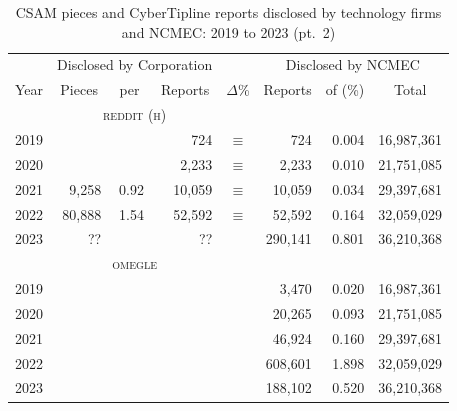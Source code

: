 \documentclass[nonacm,screen]{acmart}
\newcommand\same{\multicolumn{1}{c}{$\equiv$}}
\newcommand\missing{\multicolumn{1}{r}{??}}
\begin{document}
\begin{itemize}
\begin{table}
\begin{tabular}{r@{\hskip 1.5em}rrr r@{\hskip 1.5em}rrr}
\bottomrule
\end{tabular}
\end{table}

\begin{table}
\centering\libertineLF

\caption{CSAM pieces and CyberTipline reports disclosed by technology firms and NCMEC: 2019 to 2023 (pt.\ 2)}
\label{tab:pieces-and-reports-2}

\begin{tabular}{r@{\hskip 1.5em}rrr r@{\hskip 1.5em}rrr}
\toprule
& \multicolumn{3}{c}{Disclosed by Corporation}
& \hspace{3.5em}
& \multicolumn{3}{c}{Disclosed by NCMEC} \\
\cmidrule{2-4}\cmidrule{6-8}

Year
& \multicolumn{1}{c}{Pieces}
& \multicolumn{1}{c}{per}
& \multicolumn{1}{c}{Reports}
& \multicolumn{1}{c}{$\Delta$\%}
& \multicolumn{1}{c}{Reports}
& \multicolumn{1}{c}{of (\%)}
& \multicolumn{1}{c}{Total}\\[2ex]

& \multicolumn{3}{c}{\textsc{\MakeLowercase{Reddit (H)}}} & & & & \\ \cmidrule{2-4}
\color{lowlight} 2019 &             &        &        724 &   \same &        724 &  0.004 & \color{lowlight} 16,987,361 \\
\color{lowlight} 2020 &             &        &      2,233 &   \same &      2,233 &  0.010 & \color{lowlight} 21,751,085 \\
\color{lowlight} 2021 &       9,258 &   0.92 &     10,059 &   \same &     10,059 &  0.034 & \color{lowlight} 29,397,681 \\
\color{lowlight} 2022 &      80,888 &   1.54 &     52,592 &   \same &     52,592 &  0.164 & \color{lowlight} 32,059,029 \\
\color{lowlight} 2023 &    \missing &        &   \missing &         &    290,141 &  0.801 & \color{lowlight} 36,210,368 \\[2ex]

& \multicolumn{3}{c}{\textsc{\MakeLowercase{Omegle}}} & & & & \\ \cmidrule{2-4}
\color{lowlight} 2019 &             &        &           &          &      3,470 &  0.020 & \color{lowlight} 16,987,361 \\
\color{lowlight} 2020 &             &        &           &          &     20,265 &  0.093 & \color{lowlight} 21,751,085 \\
\color{lowlight} 2021 &             &        &           &          &     46,924 &  0.160 & \color{lowlight} 29,397,681 \\
\color{lowlight} 2022 &             &        &           &          &    608,601 &  1.898 & \color{lowlight} 32,059,029 \\
\color{lowlight} 2023 &             &        &           &          &    188,102 &  0.520 & \color{lowlight} 36,210,368 \\[2ex]


\end{tabular}
\end{table}
\end{itemize}
\end{document}
